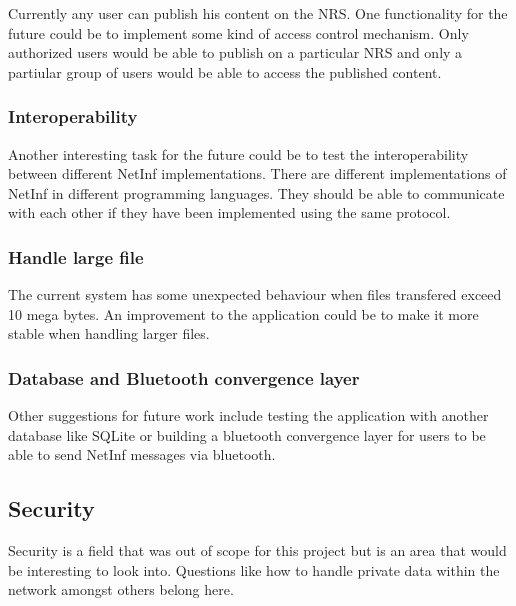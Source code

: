 Currently any user can publish his content on the NRS. One functionality for the future could be to implement some kind of access control mechanism. Only authorized users would be able to publish on a particular NRS and only a partiular group of users would be able to access the published content. 

\subsubsection{Interoperability}

Another interesting task for the future could be to test the interoperability between different NetInf implementations. There are different implementations of NetInf in different programming languages. They should be able to communicate with each other if they have been implemented using the same protocol. 

\subsubsection{Handle large file}

The current system has some unexpected behaviour when files transfered exceed 10 mega bytes. An improvement to the application could be to make it more stable when handling larger files.

\subsubsection{Database and Bluetooth convergence layer}

Other suggestions for future work include testing the application with another database like SQLite or building a bluetooth convergence layer for users to be able to send NetInf messages via bluetooth. 

\subsection{Security}

Security is a field that was out of scope for this project but is an area that would be interesting to look into. Questions like how to handle private data within the network amongst others belong here.
